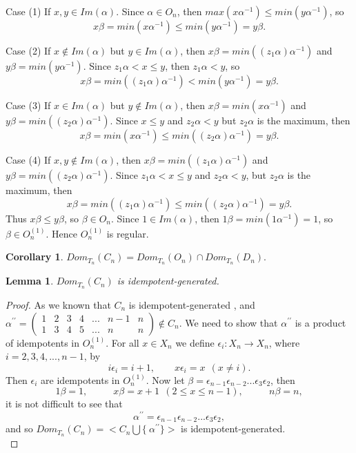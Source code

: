\documentclass[10pt]{extarticle}
\numberwithin{equation}{section}
\numberwithin{bbb}{section}
\newtheorem{lemma}{Lemma}[section]
\newtheorem{corollary}{Corollary}[section]
\numberwithin{equation}{section}
\begin{document}
Case (1) If $x, y \in Im(\alpha).$
Since $\alpha \in O_n$, then $max(x\alpha^{-1}) \leq min(y\alpha^{-1})$, so $$x\beta=min(x\alpha^{-1}) \leq min(y\alpha^{-1})=y \beta.$$

\vspace{0.1cm}
Case (2) If $x \notin Im(\alpha)$ but $y \in Im(\alpha)$, then $x\beta=min((z_1\alpha)\alpha^{-1})$ and $y\beta=min(y\alpha^{-1})$. Since $z_1\alpha < x \leq y$, then $z_1\alpha < y$, so $$x\beta=min((z_1\alpha)\alpha^{-1})<min(y\alpha^{-1})=y\beta.$$

\vspace{0.1cm}
Case (3) If $x \in Im(\alpha)$ but $y \notin Im(\alpha)$, then
$x\beta=min(x\alpha^{-1})$ and $y\beta=min((z_2\alpha)\alpha^{-1})$. Since $x \leq y$ and $z_2\alpha < y$ but $z_2\alpha$ is the maximum, then $$x\beta=min(x\alpha^{-1}) \leq min((z_2\alpha)\alpha^{-1})=y\beta.$$

\vspace{0.1cm}
Case (4) If $x , y \notin Im(\alpha)$, then $x\beta=min((z_1\alpha)\alpha^{-1})$ and $y\beta=min((z_2\alpha)\alpha^{-1})$. Since $z_1\alpha < x \leq y$ and $z_2\alpha < y$, but $z_2\alpha$ is the maximum, then $$x\beta=min((z_1\alpha)\alpha^{-1}) \leq min((z_2\alpha)\alpha^{-1})=y\beta.$$
Thus $x\beta \leq y\beta$, so $\beta \in O_n$. Since $1 \in Im(\alpha)$, then $1 \beta=min(1\alpha^{-1})=1$, so $\beta \in O_n^{(1)}$. Hence $O_n^{(1)}$ is regular.

\vspace{0.3cm}
\begin{corollary}
   $Dom_{T_{n}}(C_n)=Dom_{T_{n}}(O_n) \cap Dom_{T_{n}}(D_n).$
\end{corollary}

\vspace{0.5cm}
\begin{lemma}  
$Dom_{T_n}(C_n)$ is idempotent-generated.
\end{lemma}

\begin{proof}
  As we known that $C_n$ is idempotent-generated \cite{HI},
and 
$\alpha^{\prime\prime}=
\begin{pmatrix}  
1&2&3&4&...&n-1&n\\1&3&4&5&...&n&n
\end{pmatrix} \notin C_n.$
 We need to show that $\alpha^{\prime\prime}$ is a product of idempotents in $O_n^{(1)}.$ For all $x \in X_n$ we define $\epsilon_{i}: X_n \rightarrow X_n$, where $i=2,3,4,...,n-1$, by
$$ i\epsilon_{i}=i+1, \ \ \ \ \ \ \ \ \ x\epsilon_{i}=x \ \ (x \neq i).$$
Then $\epsilon_{i}$ are idempotents in $O_n^{(1)}$. Now let $\beta=\epsilon_{n-1}\epsilon_{n-2}...\epsilon_{3}\epsilon_{2}$, then
$$1\beta=1, \ \ \ \ \ \ \ \ \  \ \ \ x\beta=x+1 \ \ (2 \leq x \leq n-1), \ \ \ \ \ \ \ \ \ \ \ \ n\beta=n,$$
it is not difficult to see that 
$$\alpha^{\prime\prime}=\epsilon_{n-1}\epsilon_{n-2}...\epsilon_{3}\epsilon_{2},$$
and so $Dom_{T_n}(C_n)=<C_n \bigcup \{\ \alpha^{\prime\prime} \}>$ is idempotent-generated.\\
\end{proof}
\end{document}
